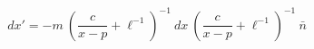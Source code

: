 \begin{equation}
dx'=-m~(\frac{c}{x-p}+\ell^{-1})^{-1}~dx~(\frac{c}{x-p}+ \ell^{-1})^{-1}~\bar{n}
\end{equation}

